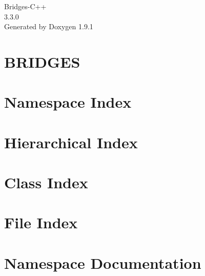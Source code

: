 \let\mypdfximage\pdfximage\def\pdfximage{\immediate\mypdfximage}\documentclass[twoside]{book}
\newcommand{\+}{\discretionary{\mbox{\scriptsize$\hookleftarrow$}}{}{}}
\newcommand{\clearemptydoublepage}{%
  \newpage{\pagestyle{empty}\cleardoublepage}%
}
\begin{document}
\raggedbottom

\hypersetup{pageanchor=false,
             bookmarksnumbered=true,
             pdfencoding=unicode
            }
\begin{titlepage}
\vspace*{7cm}
\begin{center}%
{\Large Bridges-\/\+C++ \\[1ex]\large 3.\+3.\+0 }\\
\vspace*{1cm}
{\large Generated by Doxygen 1.9.1}\\
\end{center}
\end{titlepage}
\clearemptydoublepage
{}
\tableofcontents
\clearemptydoublepage
{}
\hypersetup{pageanchor=true}

\chapter{BRIDGES}
\label{index}\hypertarget{index}{}
\chapter{Namespace Index}

\chapter{Hierarchical Index}

\chapter{Class Index}

\chapter{File Index}

\chapter{Namespace Documentation}








\end{document}
